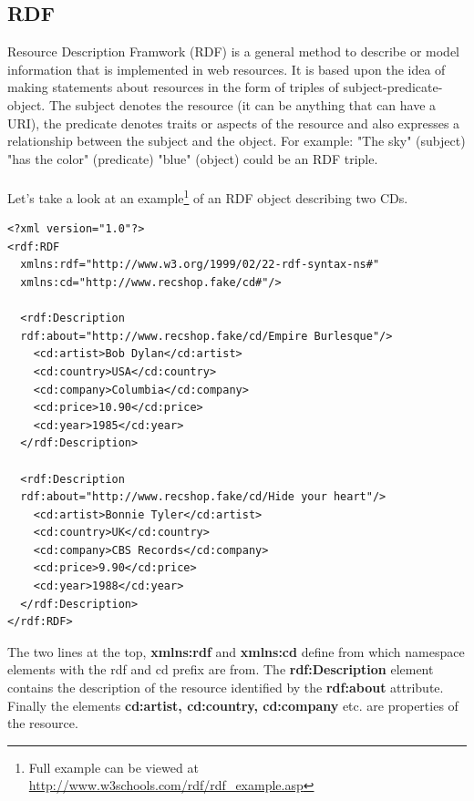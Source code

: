 \subsection{RDF}
Resource Description Framwork (RDF) is a general method to describe or model information that is implemented in web resources. It is based upon the idea of making statements about resources in the form of triples of subject-predicate-object. The subject denotes the resource (it can be anything that can have a URI), the predicate denotes traits or aspects of the resource and also expresses a relationship between the subject and the object. For example: "The sky" (subject) "has the color" (predicate) "blue" (object) could be an RDF triple.\\\\
Let's take a look at an example\footnote{Full example can be viewed at \url{http://www.w3schools.com/rdf/rdf_example.asp}} of an RDF object describing two CDs.\\
\begin{verbatim}
<?xml version="1.0"?>
<rdf:RDF 
  xmlns:rdf="http://www.w3.org/1999/02/22-rdf-syntax-ns#"
  xmlns:cd="http://www.recshop.fake/cd#"/>

  <rdf:Description
  rdf:about="http://www.recshop.fake/cd/Empire Burlesque"/>
    <cd:artist>Bob Dylan</cd:artist>
    <cd:country>USA</cd:country>
    <cd:company>Columbia</cd:company>
    <cd:price>10.90</cd:price>
    <cd:year>1985</cd:year>
  </rdf:Description>

  <rdf:Description
  rdf:about="http://www.recshop.fake/cd/Hide your heart"/>
    <cd:artist>Bonnie Tyler</cd:artist>
    <cd:country>UK</cd:country>
    <cd:company>CBS Records</cd:company>
    <cd:price>9.90</cd:price>
    <cd:year>1988</cd:year>
  </rdf:Description>
</rdf:RDF>
\end{verbatim}
\linebreak
\newline
The two lines at the top, \textbf{xmlns:rdf} and \textbf{xmlns:cd} define from which namespace elements with the rdf and cd prefix are from. The \textbf{rdf:Description} element contains the description of the resource identified by the \textbf{rdf:about} attribute. Finally the elements \textbf{cd:artist, cd:country, cd:company} etc. are properties of the resource.

